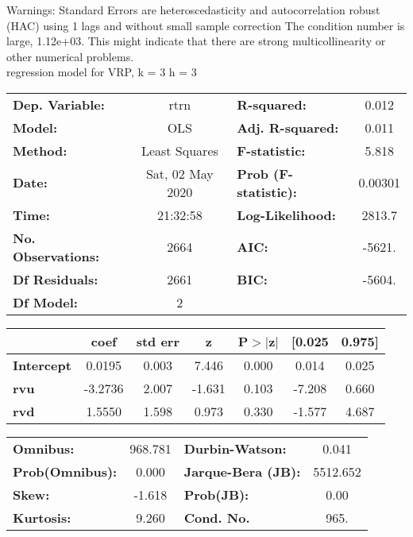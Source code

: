Warnings: \newline
 [1] Standard Errors are heteroscedasticity and autocorrelation robust (HAC) using 1 lags and without small sample correction \newline
 [2] The condition number is large, 1.12e+03. This might indicate that there are \newline
 strong multicollinearity or other numerical problems.\\ 

regression model for VRP, k = 3 h = 3\begin{center}
\begin{tabular}{lclc}
\toprule
\textbf{Dep. Variable:}    &       rtrn       & \textbf{  R-squared:         } &     0.012   \\
\textbf{Model:}            &       OLS        & \textbf{  Adj. R-squared:    } &     0.011   \\
\textbf{Method:}           &  Least Squares   & \textbf{  F-statistic:       } &     5.818   \\
\textbf{Date:}             & Sat, 02 May 2020 & \textbf{  Prob (F-statistic):} &  0.00301    \\
\textbf{Time:}             &     21:32:58     & \textbf{  Log-Likelihood:    } &    2813.7   \\
\textbf{No. Observations:} &        2664      & \textbf{  AIC:               } &    -5621.   \\
\textbf{Df Residuals:}     &        2661      & \textbf{  BIC:               } &    -5604.   \\
\textbf{Df Model:}         &           2      & \textbf{                     } &             \\
\bottomrule
\end{tabular}
\begin{tabular}{lcccccc}
                   & \textbf{coef} & \textbf{std err} & \textbf{z} & \textbf{P$> |$z$|$} & \textbf{[0.025} & \textbf{0.975]}  \\
\midrule
\textbf{Intercept} &       0.0195  &        0.003     &     7.446  &         0.000        &        0.014    &        0.025     \\
\textbf{rvu}       &      -3.2736  &        2.007     &    -1.631  &         0.103        &       -7.208    &        0.660     \\
\textbf{rvd}       &       1.5550  &        1.598     &     0.973  &         0.330        &       -1.577    &        4.687     \\
\bottomrule
\end{tabular}
\begin{tabular}{lclc}
\textbf{Omnibus:}       & 968.781 & \textbf{  Durbin-Watson:     } &    0.041  \\
\textbf{Prob(Omnibus):} &   0.000 & \textbf{  Jarque-Bera (JB):  } & 5512.652  \\
\textbf{Skew:}          &  -1.618 & \textbf{  Prob(JB):          } &     0.00  \\
\textbf{Kurtosis:}      &   9.260 & \textbf{  Cond. No.          } &     965.  \\
\bottomrule
\end{tabular}
\end{center}

